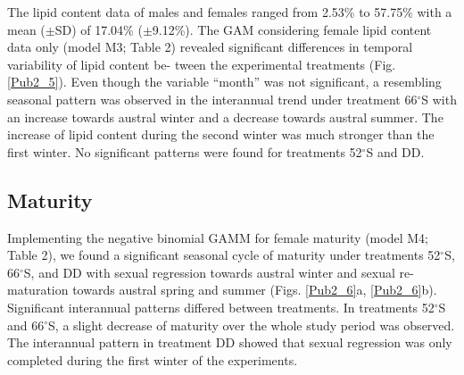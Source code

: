 The lipid content data of males and females ranged from 2.53\% to 57.75\% with
a mean ($\pm$SD) of 17.04\% ($\pm$9.12\%). The GAM considering female lipid
content data only (model M3; Table 2) revealed significant differences in
temporal variability of lipid content be- tween the experimental treatments
(Fig. \ref{Pub2_5}). Even though the variable “month” was not significant, a
resembling seasonal pattern was observed in the interannual trend under
treatment 66$^{\circ}$S with an increase towards austral winter and a decrease
towards austral summer. The increase of lipid content during the second winter
was much stronger than the first winter. No significant patterns were found for
treatments 52$^{\circ}$S and DD.

\subsection{Maturity}

Implementing the negative binomial GAMM for female maturity (model M4; Table
2), we found a significant seasonal cycle of maturity under treatments
52$^{\circ}$S, 66$^{\circ}$S, and DD with sexual regression towards austral
winter and sexual re-maturation towards austral spring and summer (Figs.
\ref{Pub2_6}a, \ref{Pub2_6}b). Significant interannual patterns differed
between treatments. In treatments 52$^{\circ}$S and 66$^{\circ}$S, a slight
decrease of maturity over the whole study period was observed. The interannual
pattern in treatment DD showed that sexual regression was only completed during
the first winter of the experiments. 


